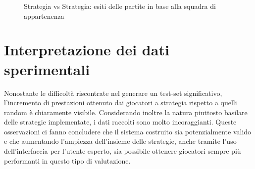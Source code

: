 \begin{figure}[!htb]
\centering



\caption {Strategia vs Strategia: esiti delle partite in base alla squadra di appartenenza} \label{pietab:esperimento-strat-strat} 
\end{figure}






\section{Interpretazione dei dati sperimentali}

Nonostante le difficoltà riscontrate nel generare un test-set significativo, l'incremento di prestazioni ottenuto dai giocatori a strategia rispetto a quelli random è chiaramente visibile.
Considerando inoltre la natura piuttosto basilare delle strategie implementate, i dati raccolti sono molto incoraggianti.
Queste osservazioni ci fanno concludere che il sistema costruito sia potenzialmente valido e che aumentando l'ampiezza dell'insieme delle strategie, anche tramite l'uso dell'interfaccia per l'utente esperto, sia possibile ottenere giocatori sempre più performanti in questo tipo di valutazione.
